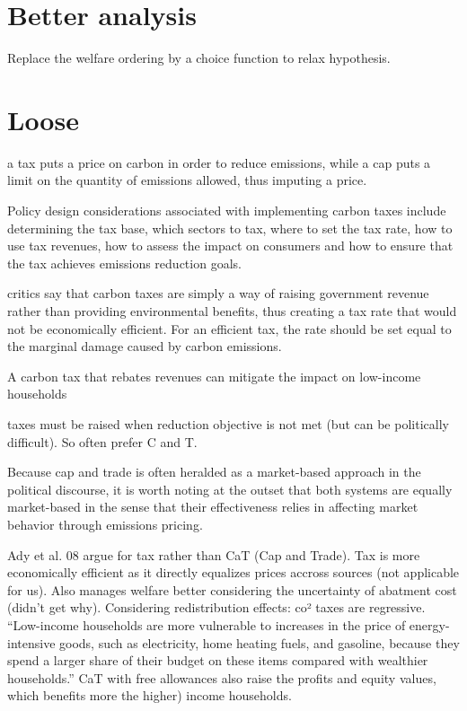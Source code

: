 \documentclass[version=3.21, pagesize, twoside=off, bibliography=totoc, DIV=calc, fontsize=12pt, a4paper, french, english]{scrartcl}
\begin{document}
\section{Better analysis}
Replace the welfare ordering by a choice function to relax hypothesis.

\section{Loose}
a tax puts a price on carbon in order to reduce emissions, while a cap puts a limit on the quantity of emissions allowed, thus imputing a price.

Policy design considerations associated with implementing carbon taxes
include determining the tax base, which sectors to tax, where to set the tax rate, how to use tax
revenues, how to assess the impact on consumers and how to ensure that the tax achieves emissions
reduction goals.

critics say that carbon taxes are simply a way of raising government
revenue rather than providing environmental benefits, thus creating a tax rate that would not be economically efficient. For an efficient tax, the rate should be set equal to the marginal damage caused by
carbon emissions.

A carbon tax that rebates revenues can mitigate the impact on low-income households

taxes must be raised when reduction objective is not met (but can be politically difficult). So often prefer C and T.

Because cap and trade is often heralded as a market-based approach in the
political discourse, it is worth noting at the outset that both systems are equally market-based in
the sense that their effectiveness relies in affecting market behavior through emissions pricing.

Ady et al. 08 argue for tax rather than CaT (Cap and Trade). Tax is more economically efficient as it directly equalizes prices accross sources (not applicable for us). Also manages welfare better considering the uncertainty of abatment cost (didn’t get why). Considering redistribution effects: co² taxes are regressive. “Low-income households are more vulnerable to increases in the price of energy-intensive
goods, such as electricity, home heating fuels, and gasoline, because they spend a larger share of
their budget on these items compared with wealthier households.” CaT with free allowances also raise the profits and equity values, which benefits more the higher) income households.
\end{document}
